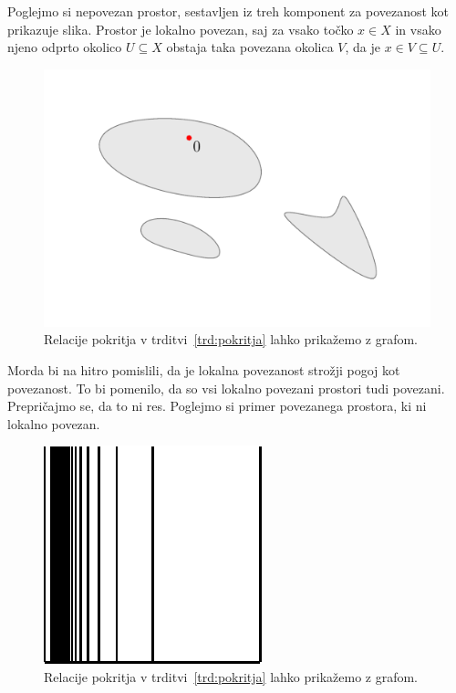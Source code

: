 \documentclass[../TG_magistrsko_delo_sections.tex]{subfiles}
\begin{document}
\begin{primer}
Poglejmo si nepovezan prostor, sestavljen iz treh komponent za povezanost kot prikazuje slika. Prostor je lokalno povezan, saj za vsako točko $x \in X$ in vsako njeno odprto okolico $U\subseteq X$ obstaja taka povezana okolica $V$, da je $x \in V \subseteq U$.
\begin{figure}[h]
  \centering
  \includegraphics{nepov-lokpov.pdf}
  \caption[Primer vektorske slike.]{Relacije pokritja v trditvi~\ref{trd:pokritja} lahko prikažemo z grafom.}
  \label{fig:varsavski_lok}
\end{figure}
\end{primer}

Morda bi na hitro pomislili, da je lokalna povezanost strožji pogoj kot povezanost. To bi pomenilo, da so vsi lokalno povezani prostori tudi povezani. Prepričajmo se, da to ni res. Poglejmo si primer povezanega prostora, ki ni lokalno povezan.

\begin{figure}[h]
  \centering
  \includegraphics{glavnik.pdf}
  \caption[Primer vektorske slike.]{Relacije pokritja v trditvi~\ref{trd:pokritja} lahko prikažemo z grafom.}
  \label{fig:varsavski_lok}
\end{figure}
\end{document}
